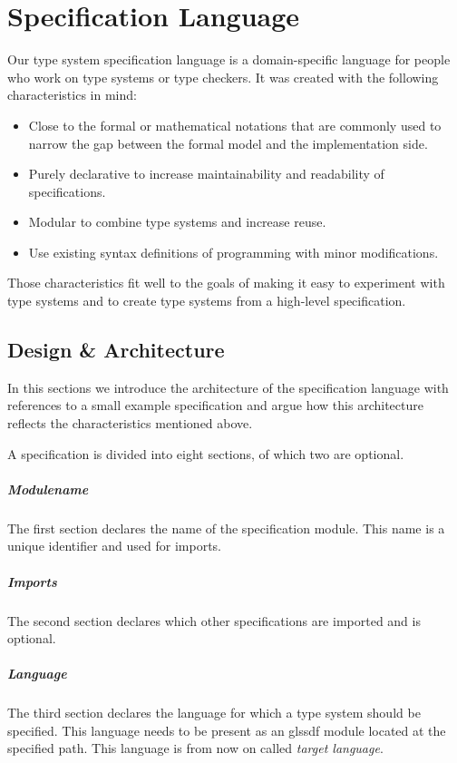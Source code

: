 \chapter{Specification Language}
Our type system specification language is a domain-specific language
for people who work on type systems or type checkers. It was created
with the following characteristics in mind:

\begin{itemize}
\item Close to the formal or mathematical notations that are commonly
  used to narrow the gap between the formal model and the
  implementation side.
\item Purely declarative to increase maintainability and readability of
  specifications.
\item Modular to combine type systems and increase reuse.
\item Use existing syntax definitions of programming with minor
  modifications.
\end{itemize}

Those characteristics fit well to the goals of making it easy to
experiment with type systems and to create type systems from a
high-level specification.
\section{Design \& Architecture}
In this sections we introduce the architecture of the specification
language with references to a small example specification and argue
how this architecture reflects the characteristics mentioned above.

A specification is divided into eight sections, of which two are
optional.

\paragraph{Modulename} The first section declares the name of the
specification module. This name is a unique identifier and used for
imports.

\paragraph{Imports} The second section declares which other
specifications are imported and is optional.

\paragraph{Language} The third section declares the language for which
a type system should be specified. This language needs to be present
as an gls{sdf} module located at the specified path. This language is
from now on called \textit{target language}.

